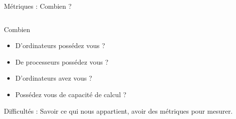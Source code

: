 %
\begin{Frame}{Métriques : Combien ?}
  \begin{columns}[t]
    \begin{column}{12cm} %
      \begin{block}{Combien}
        \begin{itemize}
        \item D'ordinateurs possédez vous ?
        \item De processeurs possédez vous ?
        \item D'ordinateurs avez vous ?
        \item Possédez vous de capacité de calcul ? 
        \end{itemize}
      \end{block}
      Difficultés : Savoir ce qui nous appartient, avoir des métriques
      pour mesurer.
    \end{column}
    
  \end{columns}  
\end{Frame}


